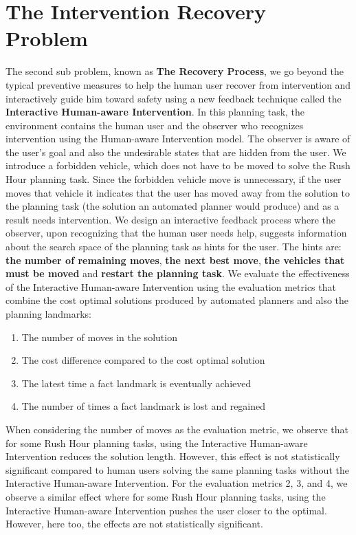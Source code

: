 \section{The Intervention Recovery Problem}
The second sub problem, known as \textbf{The Recovery Process}, we go beyond the typical preventive measures to help the human user recover from intervention and interactively guide him toward safety using a new feedback technique called the \textbf{Interactive Human-aware Intervention}.
In this planning task, the environment contains the human user and the observer who recognizes intervention using the Human-aware Intervention model.
The observer is aware of the user's goal and also the undesirable states that are hidden from the user.
We introduce a forbidden vehicle, which does not have to be moved to solve the Rush Hour planning task.
Since the forbidden vehicle move is unnecessary, if the user moves that vehicle it indicates that the user has moved away from the solution to the planning task (the solution an automated planner would produce) and as a result needs intervention.
We design an interactive feedback process where the observer, upon recognizing that the human user needs help, suggests information about the search space of the planning task as hints for the user.
The hints are: \textbf{the number of remaining moves}, \textbf{the next best move}, \textbf{the vehicles that must be moved} and \textbf{restart the planning task}.
We evaluate the effectiveness of the Interactive Human-aware Intervention using the evaluation metrics that combine the cost optimal solutions produced by automated planners and also the planning landmarks:
\begin{enumerate}
\item The number of moves in the solution
\item The cost difference compared to the cost optimal solution
\item The latest time a fact landmark is eventually achieved
\item The number of times a fact landmark is lost and regained
\end{enumerate}
When considering the number of moves as the evaluation metric, we observe that for some Rush Hour planning tasks, using the Interactive Human-aware Intervention reduces the solution length. 
However, this effect is not statistically significant compared to human users solving the same planning tasks without the Interactive Human-aware Intervention.
For the evaluation metrics 2, 3, and 4, we observe a similar effect where for some Rush Hour planning tasks, using the Interactive Human-aware Intervention pushes the user closer to the optimal.
However, here too, the effects are not statistically significant.


